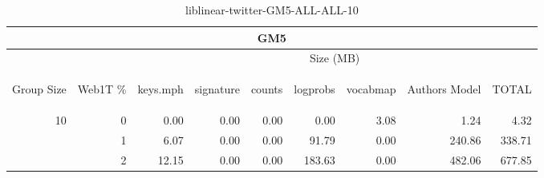 \begin{center}
\begin{table}[htbp]
\begin{tabular}{ | r | r | r | r | r | r | r | r | r |}
\hline
\multicolumn{9}{|c|}{GM5}\\
\hline
 & & \multicolumn{7}{|c|}{Size (MB)}\\ \cline{3-9}
\begin{sideways}Group Size\end{sideways} & \begin{sideways}Web1T \% \end{sideways} & \begin{sideways}keys.mph\end{sideways} & \begin{sideways}signature\end{sideways} & \begin{sideways}counts\end{sideways} & \begin{sideways}logprobs\end{sideways} & \begin{sideways}vocabmap\end{sideways} & \begin{sideways}Authors Model \end{sideways} & \begin{sideways}TOTAL\end{sideways}\\
\hline
\multirow{2}{*}{10}
 & 0 & 0.00 & 0.00 & 0.00 & 0.00 & 3.08 & 1.24 & 4.32\\ \cline{2-9}
 & 1 & 6.07 & 0.00 & 0.00 & 91.79 & 0.00 & 240.86 & 338.71\\ \cline{2-9}
 & 2 & 12.15 & 0.00 & 0.00 & 183.63 & 0.00 & 482.06 & 677.85\\ \cline{2-9}
\hline
\end{tabular}
\caption{liblinear-twitter-GM5-ALL-ALL-10}
\label{table:liblinear-twitter-GM5-ALL-ALL-10}
\end{table}
\end{center}

